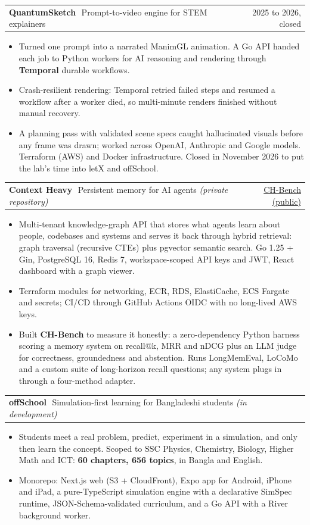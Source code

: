 \documentclass[10pt,a4paper]{article}
\makeatletter
\newcommand{\lnk}[2]{\href{#1}{\color{accent}#2}}
\newcommand{\proj}[3]{%
  \vspace{5pt}%
  \begin{tabularx}{\linewidth}{@{}X r@{}}
    {\sffamily\bfseries #1}\,{\small\color{muted}\textbar\ #2} & \small #3
  \end{tabularx}\par\vspace{-1pt}}
\makeatother
\begin{document}
\proj{QuantumSketch}{Prompt-to-video engine for STEM explainers}%
  {2025 to 2026, closed}
\begin{itemize}
  \item Turned one prompt into a narrated ManimGL animation. A Go API handed each job to Python workers for AI reasoning
        and rendering through \textbf{Temporal} durable workflows.
  \item Crash-resilient rendering: Temporal retried failed steps and resumed a workflow after a worker died, so multi-minute
        renders finished without manual recovery.
  \item A planning pass with validated scene specs caught hallucinated visuals before any frame was drawn; worked across
        OpenAI, Anthropic and Google models. Terraform (AWS) and Docker infrastructure. Closed in November 2026 to
        put the lab's time into letX and offSchool.
\end{itemize}

\proj{Context Heavy}{Persistent memory for AI agents \textit{(private repository)}}%
  {\lnk{https://github.com/shihabshahrier/CH-Bench}{CH-Bench (public)}}
\begin{itemize}
  \item Multi-tenant knowledge-graph API that stores what agents learn about people, codebases and systems and serves it back
        through hybrid retrieval: graph traversal (recursive CTEs) plus pgvector semantic search. Go 1.25 + Gin,
        PostgreSQL 16, Redis 7, workspace-scoped API keys and JWT, React dashboard with a graph viewer.
  \item Terraform modules for networking, ECR, RDS, ElastiCache, ECS Fargate and secrets; CI/CD through GitHub Actions OIDC
        with no long-lived AWS keys.
  \item Built \textbf{CH-Bench} to measure it honestly: a zero-dependency Python harness scoring a memory system on recall@k,
        MRR and nDCG plus an LLM judge for correctness, groundedness and abstention. Runs LongMemEval, LoCoMo and a custom
        suite of long-horizon recall questions; any system plugs in through a four-method adapter.
\end{itemize}

\proj{offSchool}{Simulation-first learning for Bangladeshi students \textit{(in development)}}{}
\begin{itemize}
  \item Students meet a real problem, predict, experiment in a simulation, and only then learn the concept. Scoped to SSC
        Physics, Chemistry, Biology, Higher Math and ICT: \textbf{60 chapters, 656 topics}, in Bangla and English.
  \item Monorepo: Next.js web (S3 + CloudFront), Expo app for Android, iPhone and iPad, a pure-TypeScript simulation engine
        with a declarative SimSpec runtime, JSON-Schema-validated curriculum, and a Go API with a River background worker.
\end{itemize}
\end{document}
